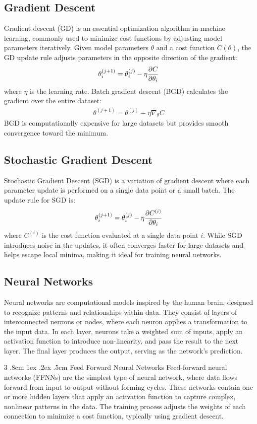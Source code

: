 \documentclass[%
reprint,
amsmath,amssymb,
aps,
]{revtex4-2}
\makeatletter
\renewcommand{\subsubsection}{%
	\@startsection
	{subsubsection}%
	{3}%
	{\z@}%
	{.8cm \@plus1ex \@minus .2ex}%
	{.5cm}%
	{\normalfont\small\centering}%
}
\makeatother
\begin{document}
\subsection{Gradient Descent}
Gradient descent (GD) is an essential optimization algorithm in machine learning, commonly used to minimize cost functions by adjusting model parameters iteratively. Given model parameters $\theta$ and a cost function $C(\theta)$, the GD update rule adjusts parameters in the opposite direction of the gradient:
\begin{align}
	\theta_i^{(j+1)}=\theta_i^{(j)}-\eta\pdv{C}{\theta_i}
\end{align}
where $\eta$ is the learning rate. Batch gradient descent (BGD) calculates the gradient over the entire dataset:
\begin{align}
	\theta^{(j+1)}=\theta^{(j)}-\eta\nabla_\theta C
\end{align}
BGD is computationally expensive for large datasets but provides smooth convergence toward the minimum.

\subsection{Stochastic Gradient Descent}
Stochastic Gradient Descent (SGD) is a variation of gradient descent where each parameter update is performed on a single data point or a small batch. The update rule for SGD is:
\[
\theta_i^{(j+1)} = \theta_i^{(j)} - \eta \pdv{C^{(i)}}{\theta_i}
\]
where $C^{(i)}$ is the cost function evaluated at a single data point $i$. While SGD introduces noise in the updates, it often converges faster for large datasets and helps escape local minima, making it ideal for training neural networks.

\subsection{Neural Networks}
Neural networks are computational models inspired by the human brain, designed to recognize patterns and relationships within data. They consist of layers of interconnected neurons or nodes, where each neuron applies a transformation to the input data. In each layer, neurons take a weighted sum of inputs, apply an activation function to introduce non-linearity, and pass the result to the next layer. The final layer produces the output, serving as the network’s prediction.

\subsubsection{Feed Forward Neural Networks}
Feed-forward neural networks (FFNNs) are the simplest type of neural network, where data flows forward from input to output without forming cycles. These networks contain one or more hidden layers that apply an activation function to capture complex, nonlinear patterns in the data. The training process adjusts the weights of each connection to minimize a cost function, typically using gradient descent.
\end{document}
